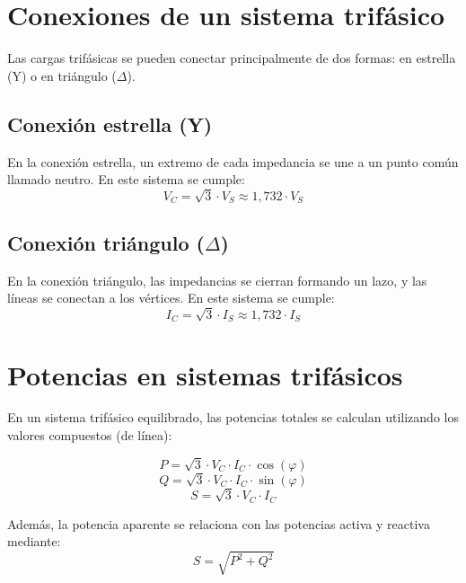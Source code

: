 \documentclass[../main]{subfiles}
\begin{document}
\section{Conexiones de un sistema trifásico}
Las cargas trifásicas se pueden conectar principalmente de dos
formas: en estrella (Y) o en triángulo ($\Delta$).

\subsection{Conexión estrella (Y)}
En la conexión estrella, un extremo de cada impedancia se une a un
punto común llamado neutro. En este sistema se cumple:
\begin{equation}
  V_C = \sqrt{3} \cdot V_S \approx 1{,}732 \cdot V_S
\end{equation}

\subsection{\texorpdfstring{Conexión triángulo ($\Delta$)}{Conexión triángulo (Delta)}}
En la conexión triángulo, las impedancias se cierran formando un
lazo, y las líneas se conectan a los vértices. En este sistema se
cumple:
\begin{equation}
  I_C = \sqrt{3} \cdot I_S \approx 1{,}732 \cdot I_S
\end{equation}

\section{Potencias en sistemas trifásicos}
En un sistema trifásico equilibrado, las potencias totales se
calculan utilizando los valores compuestos (de línea):

\begin{equation}
  P = \sqrt{3} \cdot V_C \cdot I_C \cdot \cos(\varphi)
\end{equation}
\begin{equation}
  Q = \sqrt{3} \cdot V_C \cdot I_C \cdot \sin(\varphi)
\end{equation}
\begin{equation}
  S = \sqrt{3} \cdot V_C \cdot I_C
\end{equation}

Además, la potencia aparente se relaciona con las potencias activa
y reactiva mediante:
\begin{equation}
  S = \sqrt{P^2 + Q^2}
\end{equation}
\end{document}
